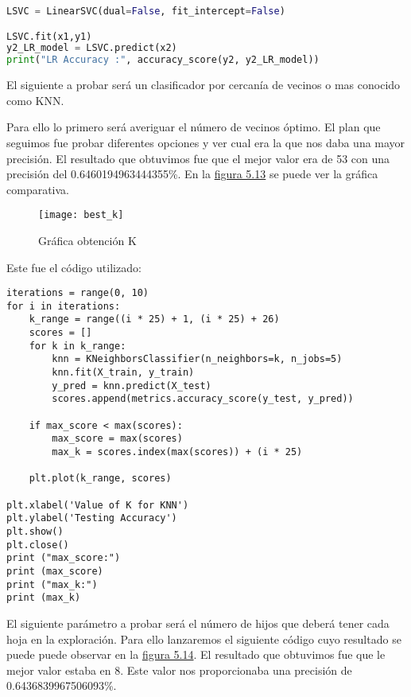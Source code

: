 \begin{lstlisting}[language=python]
LSVC = LinearSVC(dual=False, fit_intercept=False)

LSVC.fit(x1,y1)
y2_LR_model = LSVC.predict(x2)
print("LR Accuracy :", accuracy_score(y2, y2_LR_model))
\end{lstlisting}

El siguiente a probar será un clasificador por cercanía de vecinos o mas conocido como KNN.

Para ello lo primero será averiguar el número de vecinos óptimo. El plan que seguimos
fue probar diferentes opciones y ver cual era la que nos daba una mayor precisión. El resultado
que obtuvimos fue que el mejor valor era de 53 con una precisión del 0.6460194963444355\%.
En la \hyperref[fig:Gráfica obtención K]{figura 5.13} se puede ver la gráfica comparativa.

\begin{figure}[htb]
  \centering
    \texttt{[image: best\_k]}
  \caption[Gráfica obtención K]{Gráfica obtención K}
  \label{fig:Gráfica obtención K}
\end{figure}

Este fue el código utilizado:

\begin{lstlisting}
iterations = range(0, 10)
for i in iterations:
    k_range = range((i * 25) + 1, (i * 25) + 26)
    scores = []
    for k in k_range:
        knn = KNeighborsClassifier(n_neighbors=k, n_jobs=5)
        knn.fit(X_train, y_train)
        y_pred = knn.predict(X_test)
        scores.append(metrics.accuracy_score(y_test, y_pred))

    if max_score < max(scores):
        max_score = max(scores)
        max_k = scores.index(max(scores)) + (i * 25)

    plt.plot(k_range, scores)

plt.xlabel('Value of K for KNN')
plt.ylabel('Testing Accuracy')
plt.show()
plt.close()
print ("max_score:")
print (max_score)
print ("max_k:")
print (max_k)
\end{lstlisting}

El siguiente parámetro a probar será el número de hijos que deberá tener
cada hoja en la exploración. Para ello lanzaremos el siguiente código cuyo
resultado se puede puede observar en la \hyperref[fig:Gráfica obtención leaf size]{figura 5.14}. El resultado que obtuvimos
fue que le mejor valor estaba en 8. Este valor nos proporcionaba una precisión
de 0.6436839967506093\%. 

